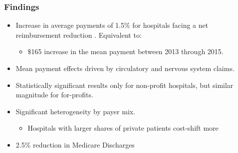 \documentclass[ucs,9pt]{beamer}
\begin{document}

\begin{frame}
\frametitle{Findings}
\begin{itemize}
\item Increase in average payments of 1.5$\%$ for hospitals facing a net reimbursement reduction .  Equivalent to:
\begin{itemize}
\item $\$$165 increase in the mean payment between 2013 through 2015.
\end{itemize}
\pause
\item Mean payment effects driven by circulatory and nervous system claims.
\pause
\item Statistically significant results only for non-profit hospitals, but similar magnitude for for-profits.
\pause
\item Significant heterogeneity by payer mix.
\begin{itemize}
\item Hospitals with larger shares of private patients cost-shift more
\end{itemize}
\pause
\item 2.5$\%$ reduction in Medicare Discharges
\end{itemize}
\end{frame}
\end{document}
